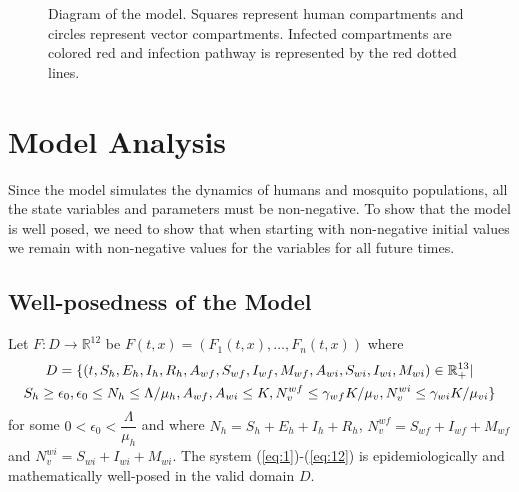 \documentclass{ws-rv9x6}
\begin{document}

\begin{figure}[H]
    \def\svgwidth{\columnwidth}
    
    \caption{Diagram of the model. Squares represent human compartments and circles represent vector compartments. Infected compartments are colored red and infection pathway is represented by the red dotted lines.}
    \label{fig:model-diagram}
\end{figure}

\newpage
\section{Model Analysis}
Since the model simulates the dynamics of humans and mosquito populations, all the state variables and parameters must be non-negative. To show that the model is well posed, we need to show that when starting with non-negative initial values we remain with non-negative values for the variables for all future times.
\subsection{Well-posedness of the Model}
\begin{theorem}
Let $F:D \to \mathbb{R}^{12}$ be
$F(t,x)=(F_1(t,x), \dots, F_n(t,x))$ where
\begin{multline*}
\noindent D = \{(t, S_h, E_h, I_h, R_h, A_{wf}, S_{wf}, I_{wf}, M_{wf}, A_{wi}, S_{wi}, I_{wi}, M_{wi})\in \mathbb{R}^{13}_+ |\\ S_h \geq \epsilon_0, \epsilon_0 \leq N_h \leq \Lambda /\mu_h, A_{wf}, A_{wi}\leq K, N_v^{wf}\leq \gamma_{wf}K/\mu_v,N_v^{wi}\leq \gamma_{wi}K/\mu_{vi}\}
\end{multline*}
 for some $0< \epsilon_0 < \dfrac{\Lambda}{\mu_h}$ and where $N_h=S_h+E_h+I_h+R_h$, $N_v^{wf}=S_{wf} +I_{wf}+M_{wf}$ and $N_v^{wi}=S_{wi} +I_{wi}+M_{wi}$.
The system (\ref{eq:1})-(\ref{eq:12}) is epidemiologically and mathematically well-posed in the valid domain $D$.

\end{theorem}
\end{document}
